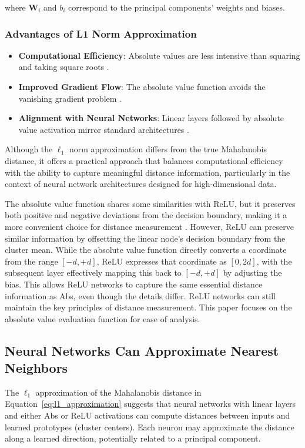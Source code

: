 where $\mathbf{W}_i$ and $b_i$ correspond to the principal components' weights and biases.

\subsubsection{Advantages of L1 Norm Approximation}
\begin{itemize}
    \item \textbf{Computational Efficiency}: Absolute values are less intensive than squaring and taking square roots \citep{hastie2009elements}.
    \item \textbf{Improved Gradient Flow}: The absolute value function avoids the vanishing gradient problem \citep{glorot2010understanding}.
    \item \textbf{Alignment with Neural Networks}: Linear layers followed by absolute value activation mirror standard architectures \citep{goodfellow2016deep}.
\end{itemize}

Although the $\ell_1$ norm approximation differs from the true Mahalanobis distance, it offers a practical approach that balances computational efficiency with the ability to capture meaningful distance information, particularly in the context of neural network architectures designed for high-dimensional data.

The absolute value function shares some similarities with ReLU, but it preserves both positive and negative deviations from the decision boundary, making it a more convenient choice for distance measurement \citep{nair2010rectified}. However, ReLU can preserve similar information by offsetting the linear node's decision boundary from the cluster mean. While the absolute value function directly converts a coordinate from the range \([-d, +d]\), ReLU expresses that coordinate as \([0, 2d]\), with the subsequent layer effectively mapping this back to \([-d, +d]\) by adjusting the bias. This allows ReLU networks to capture the same essential distance information as Abs, even though the details differ. ReLU networks can still maintain the key principles of distance measurement. This paper focuses on the absolute value evaluation function for ease of analysis.

\subsection{Neural Networks Can Approximate Nearest Neighbors}

The $\ell_1$ approximation of the Mahalanobis distance in Equation~\eqref{eq:l1_approximation} suggests that neural networks with linear layers and either Abs or ReLU activations can compute distances between inputs and learned prototypes (cluster centers). Each neuron may approximate the distance along a learned direction, potentially related to a principal component.

